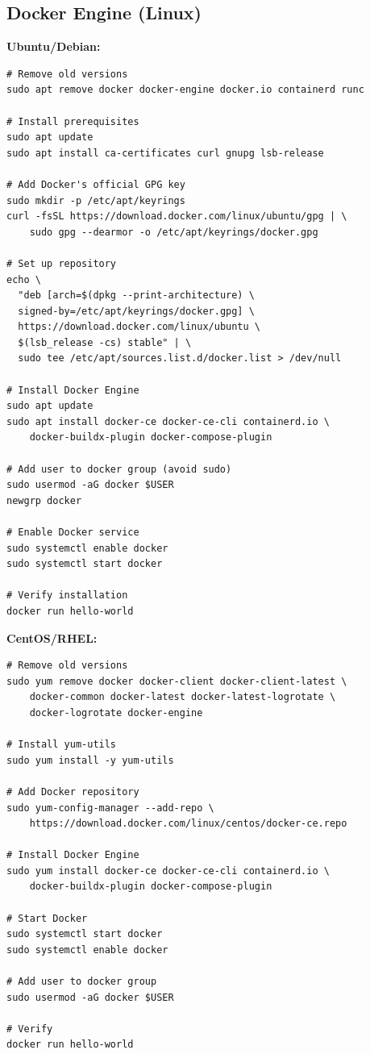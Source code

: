 \subsection{Docker Engine (Linux)}

\textbf{Ubuntu/Debian:}
\begin{lstlisting}[style=shell]
# Remove old versions
sudo apt remove docker docker-engine docker.io containerd runc

# Install prerequisites
sudo apt update
sudo apt install ca-certificates curl gnupg lsb-release

# Add Docker's official GPG key
sudo mkdir -p /etc/apt/keyrings
curl -fsSL https://download.docker.com/linux/ubuntu/gpg | \
    sudo gpg --dearmor -o /etc/apt/keyrings/docker.gpg

# Set up repository
echo \
  "deb [arch=$(dpkg --print-architecture) \
  signed-by=/etc/apt/keyrings/docker.gpg] \
  https://download.docker.com/linux/ubuntu \
  $(lsb_release -cs) stable" | \
  sudo tee /etc/apt/sources.list.d/docker.list > /dev/null

# Install Docker Engine
sudo apt update
sudo apt install docker-ce docker-ce-cli containerd.io \
    docker-buildx-plugin docker-compose-plugin

# Add user to docker group (avoid sudo)
sudo usermod -aG docker $USER
newgrp docker

# Enable Docker service
sudo systemctl enable docker
sudo systemctl start docker

# Verify installation
docker run hello-world
\end{lstlisting}

\textbf{CentOS/RHEL:}
\begin{lstlisting}[style=shell]
# Remove old versions
sudo yum remove docker docker-client docker-client-latest \
    docker-common docker-latest docker-latest-logrotate \
    docker-logrotate docker-engine

# Install yum-utils
sudo yum install -y yum-utils

# Add Docker repository
sudo yum-config-manager --add-repo \
    https://download.docker.com/linux/centos/docker-ce.repo

# Install Docker Engine
sudo yum install docker-ce docker-ce-cli containerd.io \
    docker-buildx-plugin docker-compose-plugin

# Start Docker
sudo systemctl start docker
sudo systemctl enable docker

# Add user to docker group
sudo usermod -aG docker $USER

# Verify
docker run hello-world
\end{lstlisting}


